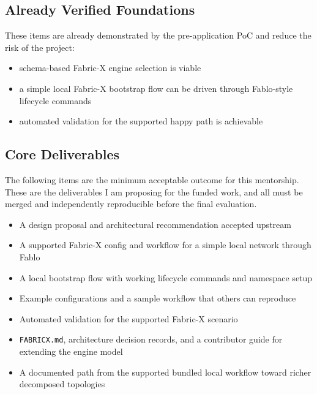 \subsection*{Already Verified Foundations}

These items are already demonstrated by the pre-application PoC and reduce the risk of the project:
\begin{itemize}[leftmargin=2em]
  \item schema-based Fabric-X engine selection is viable
  \item a simple local Fabric-X bootstrap flow can be driven through Fablo-style lifecycle commands
  \item automated validation for the supported happy path is achievable
\end{itemize}

\subsection*{Core Deliverables}

The following items are the minimum acceptable outcome for this mentorship. These are the deliverables I am proposing for the funded work, and all must be merged and independently reproducible before the final evaluation.

\begin{tcolorbox}[colback=green!5!white, colframe=green!60!black,
  title=Core Deliverables, fonttitle=\bfseries, arc=4pt]
\begin{itemize}[leftmargin=2em]
  \item[\checkmark] A design proposal and architectural recommendation accepted upstream
  \item[\checkmark] A supported Fabric-X config and workflow for a simple local network through Fablo
  \item[\checkmark] A local bootstrap flow with working lifecycle commands and namespace setup
  \item[\checkmark] Example configurations and a sample workflow that others can reproduce
  \item[\checkmark] Automated validation for the supported Fabric-X scenario
  \item[\checkmark] \texttt{FABRICX.md}, architecture decision records, and a contributor guide for extending the engine model
  \item[\checkmark] A documented path from the supported bundled local workflow toward richer decomposed topologies
\end{itemize}
\end{tcolorbox}

